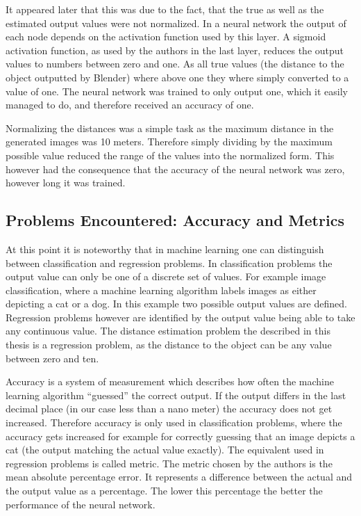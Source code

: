 It appeared later that this was due to the fact, that the true as well as the estimated output values were not normalized. In a neural network the output of each node depends on the activation function used by this layer. A sigmoid activation function, as used by the authors in the last layer, reduces the output values to numbers between zero and one. As all true values (the distance to the object outputted by Blender) where above one they where simply converted to a value of one. The neural network was trained to only output one, which it easily managed to do, and therefore received an accuracy of one.

Normalizing the distances was a simple task as the maximum distance in the generated images was 10 meters. Therefore simply dividing by the maximum possible value reduced the range of the values into the normalized form. This however had the consequence that the accuracy of the neural network was zero, however long it was trained.

\subsection{Problems Encountered: Accuracy and Metrics}
At this point it is noteworthy that in machine learning one can distinguish between classification and regression problems. In classification problems the output value can only be one of a discrete set of values. For example image classification, where a machine learning algorithm labels images as either depicting a cat or a dog. In this example two possible output values are defined. Regression problems however are identified by the output value being able to take any continuous value. The distance estimation problem the described in this thesis is a regression problem, as the distance to the object can be any value between zero and ten.

Accuracy is a system of measurement which describes how often the machine learning algorithm ``guessed'' the correct output. If the output differs in the last decimal place (in our case less than a nano meter) the accuracy does not get increased. Therefore accuracy is only used in classification problems, where the accuracy gets increased for example for correctly guessing that an image depicts a cat (the output matching the actual value exactly). The equivalent used in regression problems is called metric. The metric chosen by the authors is the mean absolute percentage error. It represents a difference between the actual and the output value as a percentage. The lower this percentage the better the performance of the neural network.

